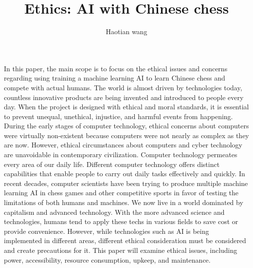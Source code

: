 \documentclass[10pt,twocolumn]{article}
\title{Ethics: AI with Chinese chess}
\author{Haotian wang}
\affiliation{Occidental College}
\begin{document}
\maketitle

	In this paper, the main scope is to focus on the ethical issues and concerns regarding using training a machine learning AI to learn Chinese chess and compete with actual humans. The world is almost driven by technologies today, countless innovative products are being invented and introduced to people every day. When the project is designed with ethical and moral standards, it is essential to prevent unequal, unethical, injustice, and harmful events from happening. During the early stages of computer technology, ethical concerns about computers were virtually non-existent because computers were not nearly as complex as they are now. However, ethical circumstances about computers and cyber technology are unavoidable in contemporary civilization. Computer technology permeates every area of our daily life. Different computer technology offers distinct capabilities that enable people to carry out daily tasks effectively and quickly. In recent decades, computer scientists have been trying to produce multiple machine learning AI in chess games and other competitive sports in favor of testing the limitations of both humans and machines. We now live in a world dominated by capitalism and advanced technology. With the more advanced science and technologies, humans tend to apply these techs in various fields to save cost or provide convenience. However, while technologies such as AI is being implemented in different areas, different ethical consideration must be considered and create precautions for it. This paper will examine ethical issues, including power, accessibility, resource consumption, upkeep, and maintenance.
\end{document}
